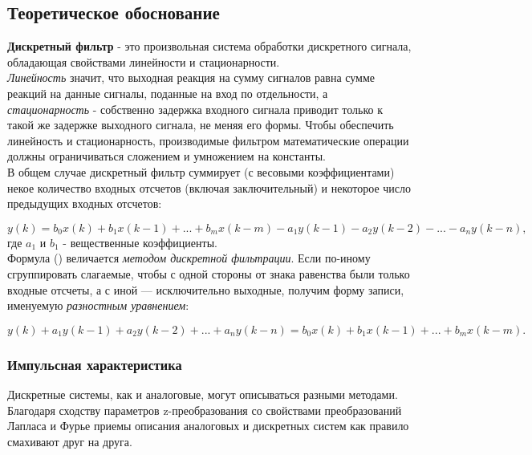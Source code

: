 \documentclass[a4paper,14pt]{article}
\begin{document}
\subsection{Теоретическое обоснование}

\hspace{0,5cm}\textbf{Дискретный фильтр} - это произвольная система обработки дискретного сигнала, обладающая свойствами линейности и стационарности. \\

\textit{Линейность} значит, что выходная реакция на сумму сигналов равна сумме реакций на данные сигналы, поданные на вход по отдельности, а \textit{стационарность} - собственно задержка входного сигнала приводит только к такой же задержке выходного сигнала, не меняя его формы.
Чтобы обеспечить линейность и стационарность, производимые фильтром
математические операции должны ограничиваться сложением и умножением на
константы.\\

В общем случае дискретный фильтр суммирует (с весовыми коэффициентами) некое количество входных отсчетов (включая заключительный) и некоторое
число предыдущих входных отсчетов:

\begin{equation}
		y(k) = b_0 x(k) + b_1 x(k-1)+...+b_m x(k-m)-a_1 y(k-1)-a_2 y(k-2)-...-a_n y(k-n),
\end{equation}
где $a_1$ и $b_1$ - вещественные коэффициенты.\\

Формула (\theequation) величается \textit{методом дискретной фильтрации}. Если
по-иному сгруппировать слагаемые, чтобы с одной стороны от знака равенства были только входные отсчеты, а с иной — исключительно выходные, получим форму записи, именуемую \textit{разностным уравнением}:

\begin{equation}
		y(k) + a_1 y(k-1)+a_2 y(k-2)+...+a_n y(k-n) = b_0 x(k) + b_1 x(k-1)+...+b_m x(k-m).
\end{equation}

\subsubsection{Импульсная характеристика}

Дискретные системы, как и аналоговые, могут описываться разными
методами. Благодаря сходству параметров z-преобразования со свойствами преобразований Лапласа и Фурье приемы описания аналоговых и дискретных систем как правило смахивают друг на друга. \\
\end{document}
